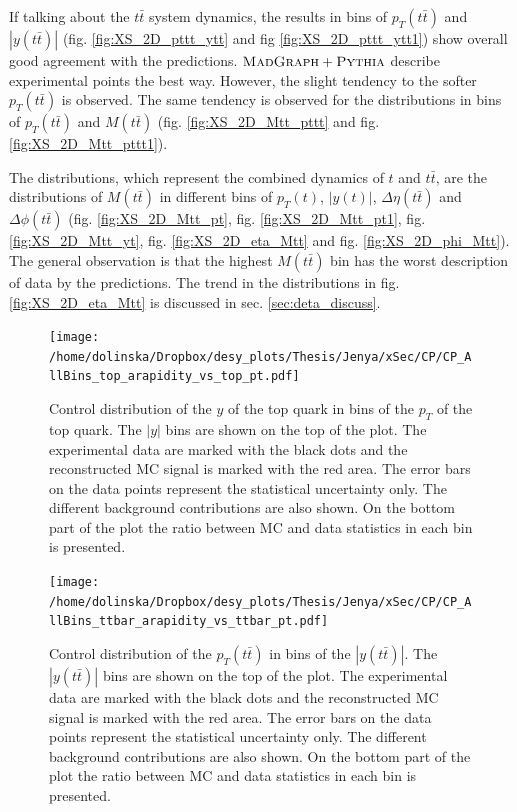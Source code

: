 If talking about the $t\bar{t}$ system dynamics, the results in bins of $p_{T}(t\bar{t})$ and $|y(t\bar{t})|$ (fig. \ref{fig:XS_2D_pttt_ytt} and fig \ref{fig:XS_2D_pttt_ytt1})
show overall good agreement with the predictions. $\textsc{MadGraph}+\textsc{Pythia}$ describe experimental points the best way. However, the slight tendency to the softer $p_{T}(t\bar{t})$
is observed. The same tendency is observed for the distributions in bins of $p_{T}(t\bar{t})$ and $M(t\bar{t})$ (fig. \ref{fig:XS_2D_Mtt_pttt} and fig. \ref{fig:XS_2D_Mtt_pttt1}).

The distributions, which represent the combined dynamics of $t$ and $t\bar{t}$, are the distributions of $M(t\bar{t})$ in different bins of $p_{T}(t)$, $|y(t)|$,
$\Delta\eta(t\bar{t})$ and $\Delta\phi(t\bar{t})$ (fig. \ref{fig:XS_2D_Mtt_pt}, fig. \ref{fig:XS_2D_Mtt_pt1}, fig. \ref{fig:XS_2D_Mtt_yt}, fig. \ref{fig:XS_2D_eta_Mtt}
and fig. \ref{fig:XS_2D_phi_Mtt}). The general observation is that the highest $M(t\bar{t})$ bin has the worst description of data by the predictions. The 
trend in the distributions in fig. \ref{fig:XS_2D_eta_Mtt} is discussed in sec. \ref{sec:deta_discuss}.



\begin{figure}[p]
  \centering
  \texttt{[image: /home/dolinska/Dropbox/desy\_plots/Thesis/Jenya/xSec/CP/CP\_AllBins\_top\_arapidity\_vs\_top\_pt.pdf]}
  \caption{Control distribution of the $y$ of the top quark in bins of the $p_{T}$ of the top quark. The $|y|$ bins are shown on the top 
  of the plot. The experimental data are marked with the black dots and the reconstructed MC signal is marked with the red area. The error
  bars on the data points represent the statistical uncertainty only. The 
  different background contributions are also shown. On the bottom part of the plot the ratio between MC and data statistics in each bin
  is presented.}
  \label{fig:CP_2D_y_pt}
\end{figure}

\begin{figure}[p]
  \centering
  \texttt{[image: /home/dolinska/Dropbox/desy\_plots/Thesis/Jenya/xSec/CP/CP\_AllBins\_ttbar\_arapidity\_vs\_ttbar\_pt.pdf]}
  \caption{Control distribution of the $p_{T}(t\bar{t})$ in bins of the $|y(t\bar{t})|$. The $|y(t\bar{t})|$ bins are shown on the top 
  of the plot. The experimental data are marked with the black dots and the reconstructed MC signal is marked with the red area. The error
  bars on the data points represent the statistical uncertainty only. The 
  different background contributions are also shown. On the bottom part of the plot the ratio between MC and data statistics in each bin
  is presented.}
  \label{fig:CP_2D_pttt_ytt}
\end{figure}


